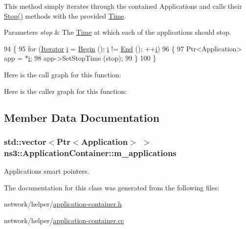 This method simply iterates through the contained Applications and calls their \hyperlink{classns3_1_1ApplicationContainer_adfc52f9aa4020c8714679b00bbb9ddb3}{Stop()} methods with the provided \hyperlink{classns3_1_1Time}{Time}.


\begin{DoxyParams}{Parameters}
{\em stop} & The \hyperlink{classns3_1_1Time}{Time} at which each of the applications should stop. \\
\hline
\end{DoxyParams}

\begin{DoxyCode}
94 \{
95   \textcolor{keywordflow}{for} (\hyperlink{classns3_1_1ApplicationContainer_a46d9e435701ffbca57fff95b97cbf0dc}{Iterator} \hyperlink{bernuolliDistribution_8m_a6f6ccfcf58b31cb6412107d9d5281426}{i} = \hyperlink{classns3_1_1ApplicationContainer_ae37428fe2d14afe32cb1a3eecfab2e4e}{Begin} (); \hyperlink{bernuolliDistribution_8m_a6f6ccfcf58b31cb6412107d9d5281426}{i} != \hyperlink{classns3_1_1ApplicationContainer_aed3e63d94451be9779fb8d00d0461bfb}{End} (); ++\hyperlink{bernuolliDistribution_8m_a6f6ccfcf58b31cb6412107d9d5281426}{i})
96     \{
97       Ptr<Application> app = *\hyperlink{bernuolliDistribution_8m_a6f6ccfcf58b31cb6412107d9d5281426}{i};
98       app->SetStopTime (stop);
99     \}
100 \}
\end{DoxyCode}


Here is the call graph for this function\+:




Here is the caller graph for this function\+:




\subsection{Member Data Documentation}
\subsubsection[{\texorpdfstring{m\+\_\+applications}{m_applications}}]{\setlength{\rightskip}{0pt plus 5cm}std\+::vector$<${\bf Ptr}$<${\bf Application}$>$ $>$ ns3\+::\+Application\+Container\+::m\+\_\+applications\hspace{0.3cm}{\ttfamily [private]}}\hypertarget{classns3_1_1ApplicationContainer_a1b5a21f86d4bf41a40b0ff9b61a33ec7}{}\label{classns3_1_1ApplicationContainer_a1b5a21f86d4bf41a40b0ff9b61a33ec7}


Applications smart pointers. 



The documentation for this class was generated from the following files\+:\begin{DoxyCompactItemize}
\item 
network/helper/\hyperlink{application-container_8h}{application-\/container.\+h}\item 
network/helper/\hyperlink{application-container_8cc}{application-\/container.\+cc}\end{DoxyCompactItemize}
